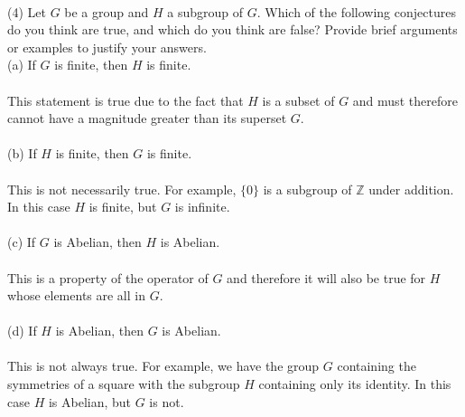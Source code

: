 \documentclass[11pt,a4paper]{article}
\begin{document}
~\\
(4) Let $G$ be a group and $H$ a subgroup of $G$. Which of the following conjectures do you think are true, and which do you think are false? Provide brief arguments or examples to justify your answers.\\
(a) If $G$ is finite, then $H$ is finite.\\
~\\
This statement is true due to the fact that $H$ is a subset of $G$ and must therefore cannot have a magnitude greater than its superset $G$.\\
~\\
(b) If $H$ is finite, then $G$ is finite.\\
~\\
This is not necessarily true. For example, $\{0\}$ is a subgroup of $\mathbb{Z}$ under addition. In this case $H$ is finite, but $G$ is infinite.\\
~\\
(c) If $G$ is Abelian, then $H$ is Abelian.\\
~\\
This is a property of the operator of $G$ and therefore it will also be true for $H$ whose elements are all in $G$.\\
~\\
(d) If $H$ is Abelian, then $G$ is Abelian.\\
~\\
This is not always true. For example, we have the group $G$ containing the symmetries of a square with the subgroup $H$ containing only its identity. In this case $H$ is Abelian, but $G$ is not.
\end{document}
